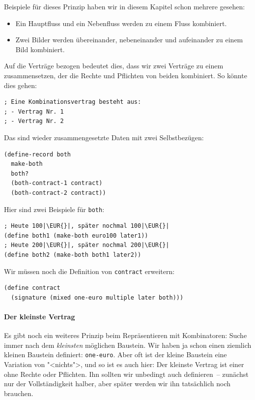 Beispiele für dieses Prinzip haben wir in diesem Kapitel schon mehrere
gesehen:
%
\begin{itemize}
\item Ein Hauptfluss und ein Nebenfluss werden zu einem Fluss
  kombiniert.
\item Zwei Bilder werden übereinander, nebeneinander und aufeinander
  zu einem Bild kombiniert.
\end{itemize}
%
Auf die Verträge bezogen bedeutet dies, dass wir zwei Verträge
zu einem zusammensetzen, der die Rechte und Pflichten von beiden kombiniert.
So könnte dies gehen:
%
\begin{lstlisting}
; Eine Kombinationsvertrag besteht aus:
; - Vertrag Nr. 1
; - Vertrag Nr. 2
\end{lstlisting}
%
Das sind wieder zusammengesetzte Daten mit zwei Selbstbezügen:
%
\begin{lstlisting}
(define-record both
  make-both
  both?
  (both-contract-1 contract)
  (both-contract-2 contract))
\end{lstlisting}
%
Hier sind zwei Beispiele für \lstinline{both}:
%
\begin{lstlisting}
; Heute 100|\EUR{}|, später nochmal 100|\EUR{}|
(define both1 (make-both euro100 later1))
; Heute 200|\EUR{}|, später nochmal 200|\EUR{}|
(define both2 (make-both both1 later2))
\end{lstlisting}
%
Wir müssen noch die Definition von \lstinline{contract} erweitern:
%
\begin{lstlisting}
(define contract
  (signature (mixed one-euro multiple later both)))
\end{lstlisting}
%

\paragraph{Der kleinste Vertrag}

Es gibt noch ein weiteres Prinzip beim Repräsentieren mit
Kombinatoren: Suche immer nach dem \emph{kleinsten} möglichen
Baustein.  Wir haben ja schon einen ziemlich kleinen Baustein
definiert: \lstinline{one-euro}.  Aber oft ist der kleine Baustein
eine Variation von "<nichts">, und so ist es auch hier: Der kleinste
Vertrag ist einer ohne Rechte oder Pflichten.  Ihn sollten wir
unbedingt auch definieren~-- zunächst nur der Vollständigkeit halber,
aber später werden wir ihn tatsächlich noch brauchen.

